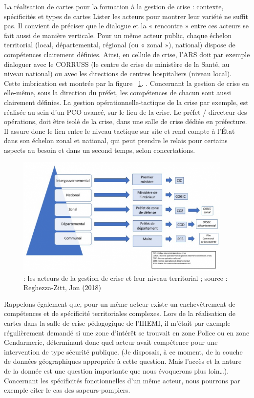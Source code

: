\documentclass[10pt,a4paper]{report} %
\begin{document}
\begin{part}{La réalisation de cartes pour la formation à la gestion de crise : contexte, spécificités et types de cartes}
Lister les acteurs pour montrer leur variété ne suffit pas. Il convient de préciser que le dialogue et la « rencontre » entre ces acteurs se fait aussi de manière verticale. Pour un même acteur public, chaque échelon territorial (local, départemental, régional (ou « zonal »), national) dispose de compétences clairement définies. Ainsi, en cellule de crise, l’ARS doit par exemple dialoguer avec le CORRUSS (le centre de crise de ministère de la Santé, au niveau national) ou avec les directions de centres hospitaliers (niveau local). Cette imbrication est montrée par la figure ~\ref{fig6}. . Concernant la gestion de crise en elle-même, sous la direction du préfet, les compétences de chacun sont aussi clairement définies. La gestion opérationnelle-tactique de la crise par exemple, est réalisée au sein d’un PCO avancé, sur le lieu de la crise. Le préfet / directeur des opérations, doit être isolé de la crise, dans une salle de crise dédiée en préfecture. Il assure donc le lien entre le niveau tactique sur site et rend compte à l’État dans son échelon zonal et national, qui peut prendre le relais pour certains aspects au besoin et dans un second temps, selon concertations. 
\begin{figure}[!t]
    \centering
    \includegraphics[width=0.95\textwidth]{figures/acteurs_crise.png}
    \caption{: les acteurs de la gestion de crise et leur niveau territorial ; source : Reghezza-Zitt, Jon (2018)}
    \label{fig6}
\end{figure}
Rappelons également que, pour un même acteur existe un enchevêtrement de compétences et de spécificité territoriales complexes. Lors de la réalisation de cartes dans la salle de crise pédagogique de l’IHEMI, il m’était par exemple régulièrement demandé si une zone d’intérêt se trouvait en zone Police ou en zone Gendarmerie, déterminant donc quel acteur avait compétence pour une intervention de type sécurité publique. (Je disposais, à ce moment, de la couche de données géographiques appropriée à cette question. Mais l’accès et la nature de la donnée est une question importante que nous évoquerons plus loin…). Concernant les spécificités fonctionnelles d’un même acteur, nous pourrons par exemple citer le cas des sapeurs-pompiers. 


\end{part}
\end{document}
